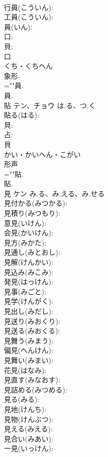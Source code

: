 \documentclass[8pt]{extreport}
\begin{document}
\begin{CJK}{UTF8}{min}
\\	行員(こういん): 
\\	工員(こういん): 
\\	員(いん): 
\\	口: 
\\	貝: 
\\	口	
\\	くち・くちへん	
\\	象形 
\\	=""員.
\\	員.
\\	貼	テン、チョウ	は.る、つ.く		
\\	貼る(はる): 
\\	貝: 
\\	占: 
\\	貝	
\\	かい・かいへん・こがい	
\\	形声 
\\	=""貼.
\\	貼.
\\	見	ケン	み.る、み.える、み.せる		
\\	見付かる(みつかる): 
\\	見積り(みつもり): 
\\	意見(いけん): 
\\	会見(かいけん): 
\\	見方(みかた): 
\\	見通し(みとおし): 
\\	見解(けんかい): 
\\	見込み(みこみ): 
\\	発見(はっけん): 
\\	見事(みごと): 
\\	見学(けんがく): 
\\	見出し(みだし): 
\\	見送り(みおくり): 
\\	見送る(みおくる): 
\\	見舞う(みまう): 
\\	偏見(へんけん): 
\\	見舞い(みまい): 
\\	花見(はなみ): 
\\	見直す(みなおす): 
\\	見詰める(みつめる): 
\\	見る(みる): 
\\	見地(けんち): 
\\	見物(けんぶつ): 
\\	見える(みえる): 
\\	見合い(みあい): 
\\	一見(いっけん): 

\end{CJK}
\end{document}
